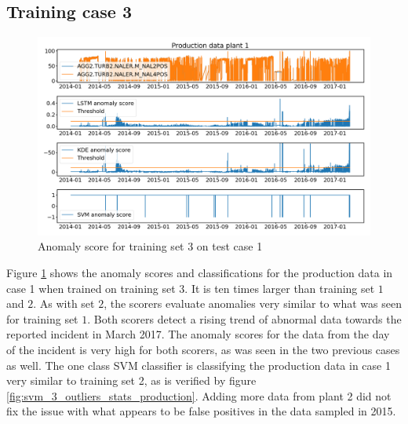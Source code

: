     \subsection{Training case 3}
        \begin{figure}[h!]
            \centering
            \includegraphics[width=\textwidth]{report/figures/analysis/plant2_train_long/production_data_anomaly.png}
            \caption{Anomaly score for training set 3 on test case 1}
            \label{fig:plant2_lomg_prod_anomaly_score}
        \end{figure}
        Figure \ref{fig:plant2_lomg_prod_anomaly_score} shows the anomaly scores and classifications for the production data in case 1 when trained on training set $3$. It is ten times larger than training set $1$ and $2$. As with set $2$, the scorers evaluate anomalies very similar to what was seen for training set $1$. Both scorers detect a rising trend of abnormal data towards the reported incident in March 2017. The anomaly scores for the data from the day of the incident is very high for both scorers, as was seen in the two previous cases as well. The one class SVM classifier is classifying the production data in case 1 very similar to training set 2, as is verified by figure \ref{fig:svm_3_outliers_stats_production}. Adding more data from plant 2 did not fix the issue with what appears to be false positives in the data sampled in 2015. 
        
